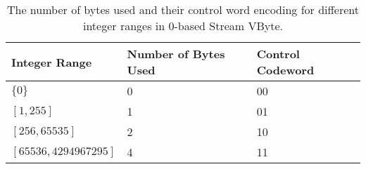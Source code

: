 \begin{table}
    \caption{The number of bytes used and their control word encoding for different integer ranges in 0-based Stream VByte. \label{tab:svb-0based}}
    \begin{tabular}{|l|l|l|}%
        \hline
        Integer Range & Number of Bytes Used & Control Codeword\\
        \hline
	$\{0\}$ & 0 & 00\\
	$[1,255]$ & 1 & 01\\
	$[256,65535]$ & 2 & 10\\
	$[65536,4294967295]$ & 4 & 11\\
        \hline
    \end{tabular}
\end{table}
